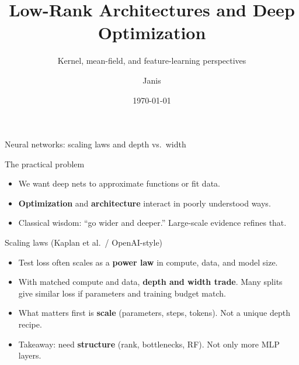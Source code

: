 \documentclass[aspectratio=169]{beamer}
\title{Low-Rank Architectures and Deep Optimization}
\subtitle{Kernel, mean-field, and feature-learning perspectives}
\author{Janis}
\date{\today}
\begin{document}
\begin{frame}
  \titlepage
\end{frame}

\begin{frame}{Neural networks: scaling laws and depth vs.\ width}
  \small
  \begin{block}{The practical problem}
    \begin{itemize}
      \item We want deep nets to approximate functions or fit data.
      \item \textbf{Optimization} and \textbf{architecture} interact in poorly understood ways.
      \item Classical wisdom: ``go wider and deeper.'' Large-scale evidence refines that.
    \end{itemize}
  \end{block}
  \begin{exampleblock}{Scaling laws (Kaplan et al.\ / OpenAI-style)}
    \begin{itemize}
      \item Test loss often scales as a \textbf{power law} in compute, data, and model size.
      \item With matched compute and data, \textbf{depth and width trade}. Many splits give similar loss if parameters and training budget match.
      \item What matters first is \textbf{scale} (parameters, steps, tokens). Not a unique depth recipe.
      \item Takeaway: need \textbf{structure} (rank, bottlenecks, RF). Not only more MLP layers.
    \end{itemize}
  \end{exampleblock}
\end{frame}
\end{document}
